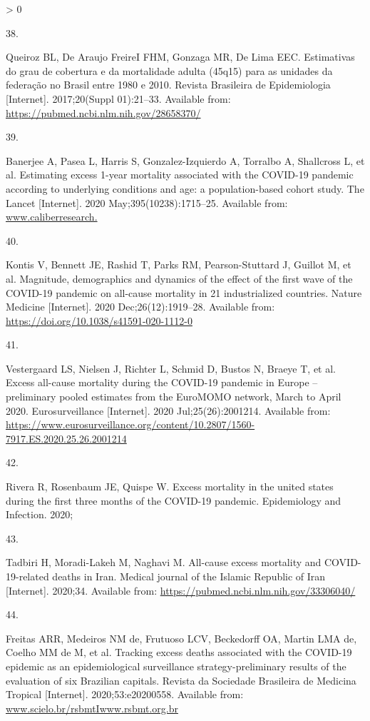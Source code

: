 \documentclass[
]{article}
\newlength{\cslhangindent}
\newlength{\csllabelwidth}
\newenvironment{CSLReferences}[2] %
 {%
  \setlength{\parindent}{0pt}
  \ifodd #1 \everypar{\setlength{\hangindent}{\cslhangindent}}\ignorespaces\fi
  \ifnum #2 > 0
  \setlength{\parskip}{#2\baselineskip}
  \fi
 }%
 {}
\newcommand{\CSLLeftMargin}[1]{\parbox[t]{\csllabelwidth}{#1}}
\newcommand{\CSLRightInline}[1]{\parbox[t]{\linewidth - \csllabelwidth}{#1}\break}
\begin{document}
\begin{CSLReferences}{0}{0}
\leavevmode\hypertarget{ref-Queiroz2017}{}%
\CSLLeftMargin{38. }
\CSLRightInline{Queiroz BL, De Araujo FreireI FHM, Gonzaga MR, De Lima EEC. {Estimativas do grau de cobertura e da mortalidade adulta (45q15) para as unidades da federa{ç}{ã}o no Brasil entre 1980 e 2010}. Revista Brasileira de Epidemiologia {[}Internet{]}. 2017;20(Suppl 01):21--33. Available from: \url{https://pubmed.ncbi.nlm.nih.gov/28658370/}}

\leavevmode\hypertarget{ref-Banerjee2020}{}%
\CSLLeftMargin{39. }
\CSLRightInline{Banerjee A, Pasea L, Harris S, Gonzalez-Izquierdo A, Torralbo A, Shallcross L, et al. {Estimating excess 1-year mortality associated with the COVID-19 pandemic according to underlying conditions and age: a population-based cohort study}. The Lancet {[}Internet{]}. 2020 May;395(10238):1715--25. Available from: \href{https://www.caliberresearch.}{www.caliberresearch.}}

\leavevmode\hypertarget{ref-Kontis2020}{}%
\CSLLeftMargin{40. }
\CSLRightInline{Kontis V, Bennett JE, Rashid T, Parks RM, Pearson-Stuttard J, Guillot M, et al. {Magnitude, demographics and dynamics of the effect of the first wave of the COVID-19 pandemic on all-cause mortality in 21 industrialized countries}. Nature Medicine {[}Internet{]}. 2020 Dec;26(12):1919--28. Available from: \url{https://doi.org/10.1038/s41591-020-1112-0}}

\leavevmode\hypertarget{ref-Vestergaard2020}{}%
\CSLLeftMargin{41. }
\CSLRightInline{Vestergaard LS, Nielsen J, Richter L, Schmid D, Bustos N, Braeye T, et al. {Excess all-cause mortality during the COVID-19 pandemic in Europe -- preliminary pooled estimates from the EuroMOMO network, March to April 2020}. Eurosurveillance {[}Internet{]}. 2020 Jul;25(26):2001214. Available from: \url{https://www.eurosurveillance.org/content/10.2807/1560-7917.ES.2020.25.26.2001214}}

\leavevmode\hypertarget{ref-Rivera2020}{}%
\CSLLeftMargin{42. }
\CSLRightInline{Rivera R, Rosenbaum JE, Quispe W. {Excess mortality in the united states during the first three months of the COVID-19 pandemic}. Epidemiology and Infection. 2020; }

\leavevmode\hypertarget{ref-Tadbiri2020}{}%
\CSLLeftMargin{43. }
\CSLRightInline{Tadbiri H, Moradi-Lakeh M, Naghavi M. {All-cause excess mortality and COVID-19-related deaths in Iran}. Medical journal of the Islamic Republic of Iran {[}Internet{]}. 2020;34. Available from: \url{https://pubmed.ncbi.nlm.nih.gov/33306040/}}

\leavevmode\hypertarget{ref-Freitas2020}{}%
\CSLLeftMargin{44. }
\CSLRightInline{Freitas ARR, Medeiros NM de, Frutuoso LCV, Beckedorff OA, Martin LMA de, Coelho MM de M, et al. {Tracking excess deaths associated with the COVID-19 epidemic as an epidemiological surveillance strategy-preliminary results of the evaluation of six Brazilian capitals}. Revista da Sociedade Brasileira de Medicina Tropical {[}Internet{]}. 2020;53:e20200558. Available from: \href{https://www.scielo.br/rsbmtIwww.rsbmt.org.br}{www.scielo.br/rsbmtIwww.rsbmt.org.br}}


\end{CSLReferences}
\end{document}
